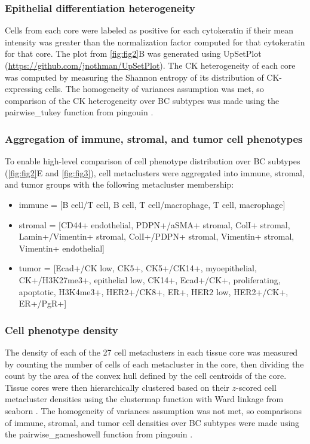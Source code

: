 \documentclass[preprint,review,3p,12pt]{elsarticle}
\begin{document}
\subsubsection{Epithelial differentiation heterogeneity}
Cells from each core were labeled as positive for each cytokeratin if their mean intensity was greater than the normalization factor computed for that cytokeratin for that core. The plot from \autoref{fig:fig2}B was generated using UpSetPlot (\url{https://github.com/jnothman/UpSetPlot}). The CK heterogeneity of each core was computed by measuring the Shannon entropy of its distribution of CK-expressing cells. The homogeneity of variances assumption was met, so comparison of the CK heterogeneity over BC subtypes was made using the pairwise\_tukey function from pingouin \cite{pingouin2018}.

\subsubsection{Aggregation of immune, stromal, and tumor cell phenotypes}
To enable high-level comparison of cell phenotype distribution over BC subtypes (\autoref{fig:fig2}E and \autoref{fig:fig3}), cell metaclusters were aggregated into immune, stromal, and tumor groups with the following metacluster membership:
\begin{itemize}
    \item immune = [B cell/T cell, B cell, T cell/macrophage, T cell, macrophage]
    \item stromal = [CD44+ endothelial, PDPN+/aSMA+ stromal, ColI+ stromal, Lamin+/Vimentin+ stromal, ColI+/PDPN+ stromal, Vimentin+ stromal, Vimentin+ endothelial]
    \item tumor = [Ecad+/CK low, CK5+, CK5+/CK14+, myoepithelial, CK+/H3K27me3+, epithelial low, CK14+, Ecad+/CK+, proliferating, apoptotic, H3K4me3+, HER2+/CK8+, ER+, HER2 low, HER2+/CK+, ER+/PgR+]
\end{itemize}

\subsubsection{Cell phenotype density}
The density of each of the 27 cell metaclusters in each tissue core was measured by counting the number of cells of each metacluster in the core, then dividing the count by the area of the convex hull defined by the cell centroids of the core. Tissue cores were then hierarchically clustered based on their $z$-scored cell metacluster densities using the clustermap function with Ward linkage from seaborn \cite{seaborn2020}. The homogeneity of variances assumption was not met, so comparisons of immune, stromal, and tumor cell densities over BC subtypes were made using the pairwise\_gameshowell function from pingouin \cite{pingouin2018}.
\end{document}
